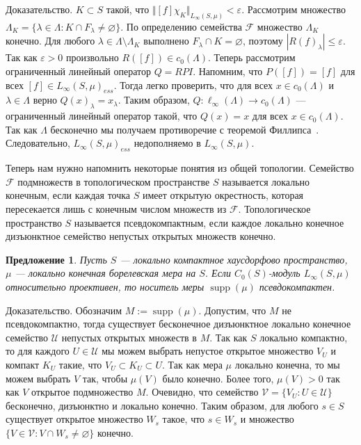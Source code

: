 \documentclass[12pt]{article}
\numberwithin{equation}{subsection}
\theoremstyle{plain}
\newtheorem{proposition}{Предложение}
\newenvironment{proof}{Доказательство.}{}
\begin{document}
\begin{fulltext}
\begin{proof}
        $K\subset S$ такой, что $\Vert
            [f]\chi_{K}\Vert_{L_\infty(S,\mu)}<\varepsilon$. Рассмотрим множество
        $\Lambda_K=\{\lambda\in\Lambda: K\cap F_\lambda\neq\varnothing \}$. По
        определению семейства $\mathcal{F}$ множество $\Lambda_K$ конечно. Для
        любого $\lambda\in\Lambda\setminus \Lambda_K$ выполнено $F_\lambda\cap
            K=\varnothing$, поэтому $|{R(f)}_\lambda|\leq\varepsilon$. Так как
        $\varepsilon>0$ произвольно $R([f])\in c_0(\Lambda)$. Теперь рассмотрим
        ограниченный линейный оператор $Q=RPI$. Напомним, что $P([f])=[f]$ для
        всех $[f]\in {L_\infty(S,\mu)}_{ess}$. Тогда легко проверить, что для
        всех $x\in c_0(\Lambda)$ и $\lambda\in\Lambda$ верно
        ${Q(x)}_\lambda=x_\lambda$. Таким образом, $Q:\ell_\infty(\Lambda)\to
            c_0(\Lambda)$ --- ограниченный линейный оператор такой, что $Q(x)=x$ для
        всех $x\in c_0(\Lambda)$. Так как $\Lambda$ бесконечно мы получаем
        противоречие с теоремой Филлипса~\cite{PhilOnLinTran}. Следовательно,
        ${L_\infty(S,\mu)}_{ess}$ недополняемо в $L_\infty(S,\mu)$.
    \end{proof}

    Теперь нам нужно напомнить некоторые понятия из общей топологии. Семейство
    $\mathcal{F}$ подмножеств в топологическом пространстве $S$ называется
    локально конечным, если каждая точка $S$ имеет открытую окрестность, которая
    пересекается лишь с конечным числом множеств из $\mathcal{F}$.
    Топологическое пространство $S$ называется псевдокомпактным, если каждое
    локально конечное дизъюнктное семейство непустых открытых множеств конечно.

    \begin{proposition}\label{LInfRelProjSuppCond} Пусть $S$ --- локально
        компактное хаусдорфово пространст\-во, $\mu$ --- локально конечная
        борелевская мера на $S$. Если $C_0(S)$-модуль $L_\infty(S,\mu)$
        относительно проективен, то носитель меры $\operatorname{supp}(\mu)$
        псевдокомпактен.
    \end{proposition}
    \begin{proof} Обозначим $M:=\operatorname{supp}(\mu)$. Допустим, что $M$ не
        псевдокомпактно, тогда существует бесконечное дизъюнктное локально
        конечное семейство $\mathcal{U}$ непустых открытых множеств в $M$. Так
        как $S$ локально компактно, то для каждого $U\in\mathcal{U}$ мы можем
        выбрать непустое открытое множество $V_U$ и компакт $K_U$ такие, что
        $V_U\subset K_U\subset  U$. Так как мера $\mu$ локально конечна, то мы
        можем выбрать $V$ так, чтобы $\mu(V)$ было конечно. Более того,
        $\mu(V)>0$ так как $V$ открытое подмножество $M$. Очевидно, что
        семейство $\mathcal{V}=\{V_U:U\in\mathcal{U}\}$ бесконечно, дизъюнктно и
        локально конечно. Таким образом, для любого $s\in S$ существует открытое
        множество $W_s$ такое, что $s\in W_s$ и множество $\{V\in\mathcal{V}:
            V\cap W_s\neq\varnothing \}$ конечно.


\end{proof}
\end{fulltext}
\end{document}
